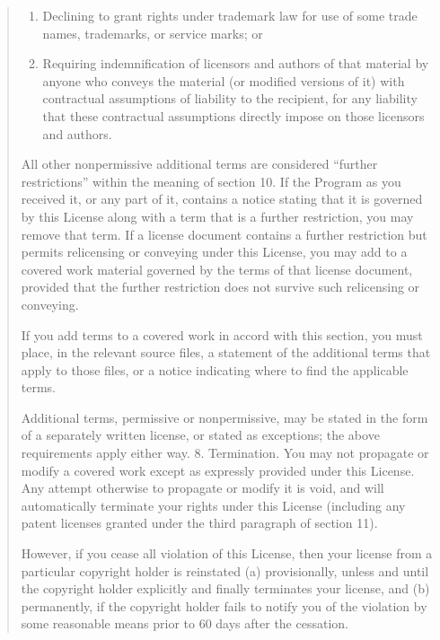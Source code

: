 \documentclass[letterpaper,10pt,english]{sphinxmanual}
\begin{document}
\begin{quote}
\begin{description}
\begin{enumerate}
\item {} 
Declining to grant rights under trademark law for use of some trade names, trademarks, or service marks; or

\item {} 
Requiring indemnification of licensors and authors of that material by anyone who conveys the material (or modified versions of it) with contractual assumptions of liability to the recipient, for any liability that these contractual assumptions directly impose on those licensors and authors.

\end{enumerate}

\end{description}

All other non\sphinxhyphen{}permissive additional terms are considered “further restrictions” within the meaning of section 10. If the Program as you received it, or any part of it, contains a notice stating that it is governed by this License along with a term that is a further restriction, you may remove that term. If a license document contains a further restriction but permits relicensing or conveying under this License, you may add to a covered work material governed by the terms of that license document, provided that the further restriction does not survive such relicensing or conveying.

If you add terms to a covered work in accord with this section, you must place, in the relevant source files, a statement of the additional terms that apply to those files, or a notice indicating where to find the applicable terms.

Additional terms, permissive or non\sphinxhyphen{}permissive, may be stated in the form of a separately written license, or stated as exceptions; the above requirements apply either way.
8. Termination.
You may not propagate or modify a covered work except as expressly provided under this License. Any attempt otherwise to propagate or modify it is void, and will automatically terminate your rights under this License (including any patent licenses granted under the third paragraph of section 11).

However, if you cease all violation of this License, then your license from a particular copyright holder is reinstated (a) provisionally, unless and until the copyright holder explicitly and finally terminates your license, and (b) permanently, if the copyright holder fails to notify you of the violation by some reasonable means prior to 60 days after the cessation.


\end{quote}
\end{document}
